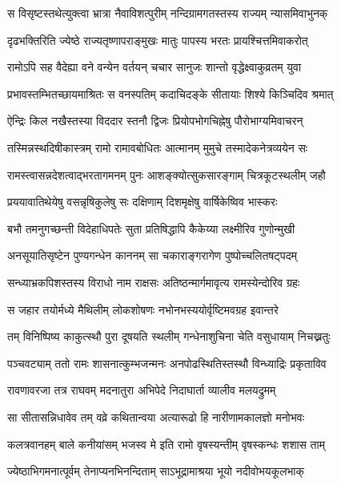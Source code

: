 \twolineshloka
{स विसृष्टस्तथेत्युक्त्वा भ्रात्रा नैवाविशत्पुरीम्}
{नन्दिग्रामगतस्तस्य राज्यम् न्यासमिवाभुनक्} %

\twolineshloka
{दृढभक्तिरिति ज्येष्ठे राज्यतृष्णापराङ्मुखः}
{मातुः पापस्य भरतः प्रायश्चित्तमिवाकरोत्} %

\twolineshloka
{रामोऽपि सह वैदेह्या वने वन्येन वर्तयन्}
{चचार सानुजः शान्तो वृद्धेक्ष्वाकुव्रतम् युवा} %

\twolineshloka
{प्रभावस्तम्भितच्छायमाश्रितः स वनस्पतिम्}
{कदाचिदङ्के सीतायाः शिश्ये किञ्चिदिव श्रमात्} %

\twolineshloka
{ऐन्द्रिः किल नखैस्तस्या विददार स्तनौ द्विजः}
{प्रियोपभोगचिह्नेषु पौरोभाग्यमिवाचरन्} %

\twolineshloka
{तस्मिन्नस्थदिषीकास्त्रम् रामो रामावबोधितः}
{आत्मानम् मुमुचे तस्मादेकनेत्रव्ययेन सः} %

\twolineshloka
{रामस्त्वासन्नदेशत्वाद्भरतागमनम् पुनः}
{आशङ्क्योत्सुकसारङ्गाम् चित्रकूटस्थलीम् जहौ} %

\twolineshloka
{प्रययावातिथेयेषु वसन्नृषिकुलेषु सः}
{दक्षिणाम् दिशमृक्षेषु वार्षिकेष्विव भास्करः} %

\twolineshloka
{बभौ तमनुगच्छन्ती विदेहाधिपतेः सुता}
{प्रतिषिद्धापि कैकेय्या लक्ष्मीरिव गुणोन्मुखी} %

\twolineshloka
{अनसूयातिसृष्टेन पुण्यगन्धेन काननम्}
{सा चकाराङ्गरागेण पुष्पोच्चलितषट्पदम्} %

\twolineshloka
{सन्ध्याभ्रकपिशस्तस्य विराधो नाम राक्षसः}
{अतिष्ठन्मार्गमावृत्य रामस्येन्दोरिव ग्रहः} %

\twolineshloka
{स जहार तयोर्मध्ये मैथिलीम् लोकशोषणः}
{नभोनभस्ययोर्वृष्टिमवग्रह इवान्तरे} %

\twolineshloka
{तम् विनिष्पिष्य काकुत्स्थौ पुरा दूषयति स्थलीम्}
{गन्धेनाशुचिना चेति वसुधायाम् निचख्नतुः} %

\twolineshloka
{पञ्चवट्याम् ततो रामः शासनात्कुम्भजन्मनः}
{अनपोढस्थितिस्तस्थौ विन्ध्याद्रिः प्रकृताविव} %

\twolineshloka
{रावणावरजा तत्र राघवम् मदनातुरा}
{अभिपेदे निदाघार्ता व्यालीव मलयद्रुमम्} %

\twolineshloka
{सा सीतासन्निधावेव तम् वव्रे कथितान्वया}
{अत्यारूढो हि नारीणामकालज्ञो मनोभवः} %

\twolineshloka
{कलत्रवानहम् बाले कनीयांसम् भजस्व मे}
{इति रामो वृषस्यन्तीम् वृषस्कन्धः शशास ताम्} %

\twolineshloka
{ज्येष्ठाभिगमनात्पूर्वम् तेनाप्यनभिनन्दिताम्}
{साऽभूद्रामाश्रया भूयो नदीवोभयकूलभाक्} %


